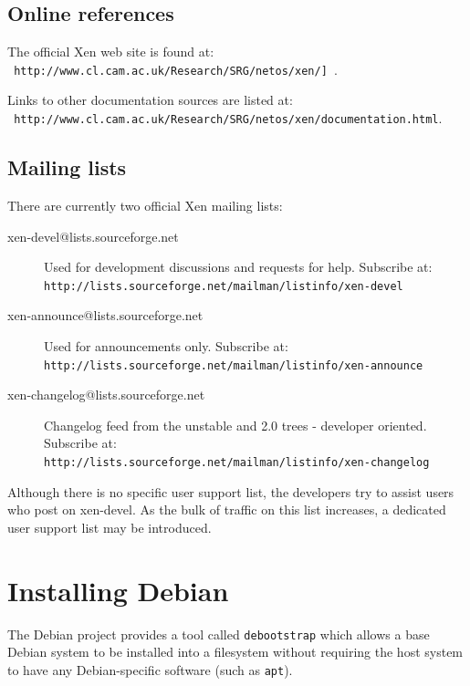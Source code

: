 \documentclass[11pt,twoside,final,openright]{xenstyle}
\begin{document}
{\section{Online references}

The official Xen web site is found at: \\
{\tt
http://www.cl.cam.ac.uk/Research/SRG/netos/xen/] }.

Links to other
documentation sources are listed at: \\ {\tt
http://www.cl.cam.ac.uk/Research/SRG/netos/xen/documentation.html}.

\section{Mailing lists}

There are currently two official Xen mailing lists:

\begin{description}
\item[xen-devel@lists.sourceforge.net] Used for development
discussions and requests for help.  Subscribe at: \\
{\tt http://lists.sourceforge.net/mailman/listinfo/xen-devel}
\item[xen-announce@lists.sourceforge.net] Used for announcements only.
Subscribe at: \\
{\tt http://lists.sourceforge.net/mailman/listinfo/xen-announce}
\item[xen-changelog@lists.sourceforge.net]  Changelog feed
from the unstable and 2.0 trees - developer oriented.  Subscribe at: \\
{\tt http://lists.sourceforge.net/mailman/listinfo/xen-changelog}
\end{description}

Although there is no specific user support list, the developers try to
assist users who post on xen-devel.  As the bulk of traffic on this
list increases, a dedicated user support list may be introduced.

\appendix

\chapter{Installing Debian}

The Debian project provides a tool called {\tt debootstrap} which
allows a base Debian system to be installed into a filesystem without
requiring the host system to have any Debian-specific software (such
as {\tt apt}).

}
\end{document}
